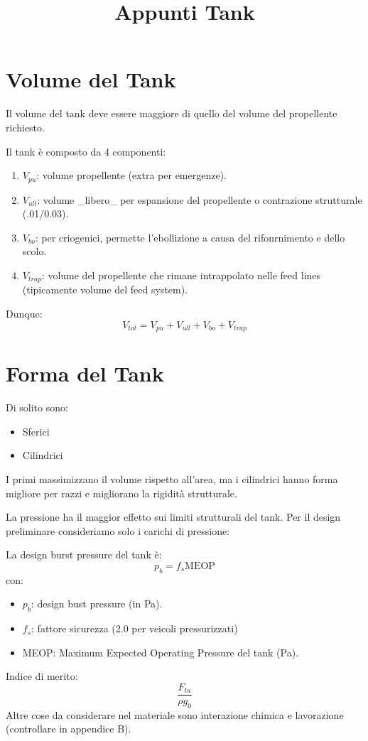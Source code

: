 \documentclass[a4paper]{article}
\title{Appunti Tank}
\begin{document}
    \maketitle
    \tableofcontents
    \section{Volume del Tank}
    Il volume del tank deve essere maggiore di 
    quello del volume del propellente richiesto.

    Il tank è composto da 4 componenti:
    \begin{enumerate}
        \item $V_{pu}$: volume propellente (extra per emergenze).
        \item $V_{ull}$: volume _libero_ per espansione del propellente o contrazione strutturale (.01/0.03).
        \item $V_{bo}$: per criogenici, permette l'ebollizione a causa del rifonrnimento e dello scolo.
        \item $V_{trap}$: volume del propellente che rimane intrappolato nelle feed lines (tipicamente volume del feed system).  
    \end{enumerate}
    Dunque: 
    \[V_{tot} = V_{pu} + V_{ull} + V_{bo} + V_{trap}\]
    \section{Forma del Tank}
    Di solito sono: 
    \begin{itemize}
        \item Sferici
        \item Cilindrici
    \end{itemize}
    I primi massimizzano il volume rispetto all'area, ma i cilindrici hanno forma 
    migliore per razzi e migliorano la rigidità strutturale.
    
    La pressione ha il maggior effetto sui limiti strutturali del tank. Per il design
    preliminare consideriamo solo i carichi di pressione:

    La design burst pressure del tank è:
    \[p_b = f_s \text{MEOP}\]
    con: 
    \begin{itemize}
        \item $p_b$: design bust pressure (in Pa).
        \item $f_s$: fattore sicurezza (2.0 per veicoli pressurizzati)
        \item MEOP: Maximum Expected Operating Pressure del tank (Pa).
    \end{itemize}
    Indice di merito: \[\frac{F_{tu}}{\rho g_0}\]
    Altre cose da considerare nel materiale sono interazione 
    chimica e lavorazione (controllare in appendice B).
\end{document}
